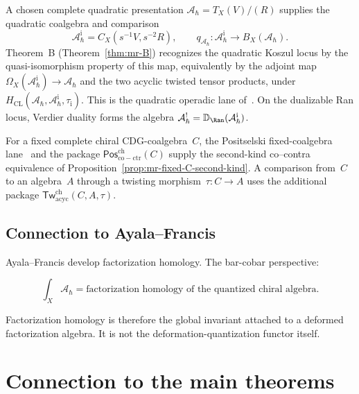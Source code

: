 A chosen complete quadratic presentation
\(\mathcal A_\hbar=T_X(V)/(R)\) supplies the quadratic coalgebra and
comparison
\[
 \mathcal A_\hbar^{\mathrm i}=C_X(s^{-1}V,s^{-2}R),
 \qquad
 q_{\mathcal A_\hbar}\colon
 \mathcal A_\hbar^{\mathrm i}\longrightarrow B_X(\mathcal A_\hbar).
\]
Theorem~B \textup{(}Theorem~\ref{thm:mr-B}\textup{)} recognizes the
quadratic Koszul locus by the quasi-isomorphism property of this map,
equivalently by the adjoint map
\(\Omega_X(\mathcal A_\hbar^{\mathrm i})\to\mathcal A_\hbar\) and
the two acyclic twisted tensor products, under
\(H_{\mathrm{CL}}(\mathcal A_\hbar,
\mathcal A_\hbar^{\mathrm i},\tau_{\mathrm i})\).  This is the
quadratic operadic lane of~\cite{GLZ22}.  On the dualizable Ran locus,
Verdier duality forms the algebra
\(\mathcal A_\hbar^!=\mathbb D_{\Ran}
(\mathcal A_\hbar^{\mathrm i})\).

For a fixed complete chiral CDG-coalgebra~\(C\), the Positselski
fixed-coalgebra lane~\cite{Positselski11} and the package
\(\mathsf{Pos}^{\mathrm{ch}}_{\mathrm{co-ctr}}(C)\) supply the
second-kind co--contra equivalence of
Proposition~\ref{prop:mr-fixed-C-second-kind}.  A comparison from~\(C\)
to an algebra~\(A\) through a twisting morphism~\(\tau\colon C\to A\)
uses the additional package
\(\mathsf{Tw}^{\mathrm{ch}}_{\mathrm{acyc}}(C,A,\tau)\).

\subsection{Connection to Ayala--Francis}

Ayala--Francis \cite{AF15} develop factorization homology. The bar-cobar perspective:

\[
\int_X \mathcal{A}_\hbar
= \text{factorization homology of the quantized chiral algebra}.
\]

Factorization homology is therefore the global invariant attached to a
deformed factorization algebra. It is not the deformation-quantization
functor itself.

\section{Connection to the main theorems}

